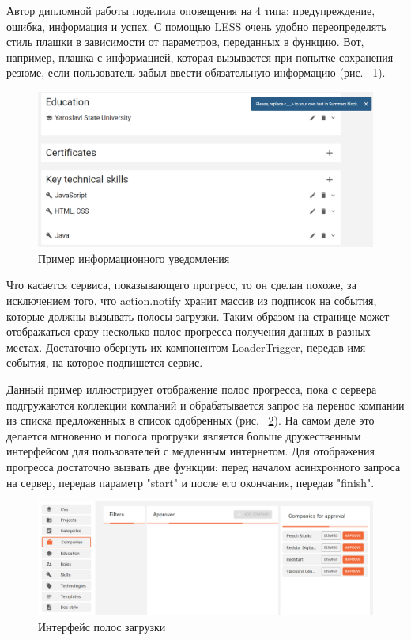 \documentclass[14pt, a4paper]{diplom}
\begin{document}
Автор дипломной работы поделила оповещения на 4 типа: предупреждение, ошибка, информация и успех. С помощью
LESS очень удобно переопределять стиль плашки в зависимости от параметров, переданных в
функцию. Вот, например, плашка с информацией, которая вызывается при попытке сохранения резюме, если пользователь
забыл ввести обязательную информацию (рис. ~\ref{5}).

\begin{figure}[!ht]
\centering
\includegraphics[width=1\textwidth]{resources/toast.png}
\caption{Пример информационного уведомления}
\label{5}
\end{figure}

Что касается сервиса, показывающего прогресс, то он сделан похоже, за исключением того, что action.notify хранит массив
из подписок на события, которые должны вызывать полосы загрузки. Таким образом на странице может отображаться сразу несколько полос прогресса получения данных в разных местах. Достаточно обернуть их
компонентом LoaderTrigger, передав имя события, на которое подпишется сервис.

Данный пример иллюстрирует отображение полос прогресса, пока с сервера подгружаются коллекции компаний и обрабатывается запрос на перенос компании из списка предложенных в список одобренных (рис. ~\ref{6}).
На самом деле это делается мгновенно и полоса прогрузки является больше дружественным интерфейсом для пользователей с медленным интернетом. Для отображения прогресса достаточно вызвать две функции: перед началом асинхронного запроса на сервер, передав параметр "start" и после его окончания, передав "finish".

\begin{figure}[!ht]
\centering
\includegraphics[width=1\textwidth]{resources/progress.png}
\caption{Интерфейс полос загрузки}
\label{6}
\end{figure}
\end{document}
